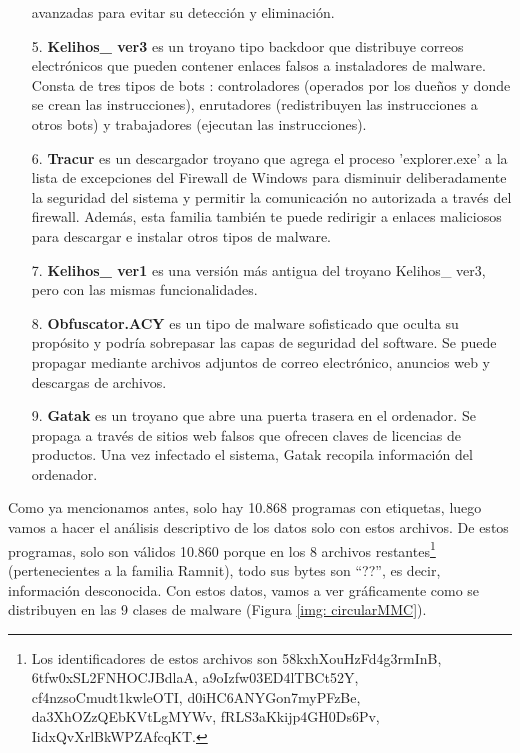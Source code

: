 \begin{enumerate}
\item[] avanzadas para evitar su detección y eliminación.
\item[5.] \textbf{Kelihos\_ ver3} es un troyano tipo backdoor que distribuye correos electrónicos que pueden contener enlaces falsos a instaladores de malware. Consta de tres tipos de bots \citep{kerkers2014characterisation}: controladores (operados por los dueños y donde se crean las instrucciones), enrutadores (redistribuyen las instrucciones a otros bots) y trabajadores (ejecutan las instrucciones).

\item[6.] \textbf{Tracur} es un descargador troyano que agrega el proceso 'explorer.exe' a la lista de excepciones del Firewall de Windows para disminuir deliberadamente la seguridad del sistema y permitir la comunicación no autorizada a través del firewall. Además, esta familia también te puede redirigir a enlaces maliciosos para descargar e instalar otros tipos de malware.

\item[7.] \textbf{Kelihos\_ ver1} es una versión más antigua del troyano Kelihos\_ ver3, pero con las mismas funcionalidades.

\item[8.] \textbf{Obfuscator.ACY} es un tipo de malware sofisticado que oculta su propósito y podría sobrepasar las capas de seguridad del software.  Se puede propagar mediante archivos adjuntos de correo electrónico, anuncios web y descargas de archivos. 
\item[9.] \textbf{Gatak} es un troyano que abre una puerta trasera en el ordenador. Se propaga a través de sitios web falsos que ofrecen claves de licencias de productos. Una vez infectado el sistema, Gatak recopila información del ordenador.
\end{enumerate} 

Como ya mencionamos antes, solo hay 10.868 programas con etiquetas, luego vamos a hacer el análisis descriptivo de los datos solo con estos archivos. De estos programas, solo son válidos 10.860 porque en los 8 archivos restantes\footnote{Los identificadores de estos archivos son 58kxhXouHzFd4g3rmInB, 6tfw0xSL2FNHOCJBdlaA, a9oIzfw03ED4lTBCt52Y, cf4nzsoCmudt1kwleOTI, d0iHC6ANYGon7myPFzBe, da3XhOZzQEbKVtLgMYWv, fRLS3aKkijp4GH0Ds6Pv, IidxQvXrlBkWPZAfcqKT.} (pertenecientes a la familia Ramnit), todo sus bytes son ``??'', es decir, información desconocida. Con estos datos, vamos a ver gráficamente como se distribuyen en las 9 clases de malware (Figura \ref{img: circularMMC}).


